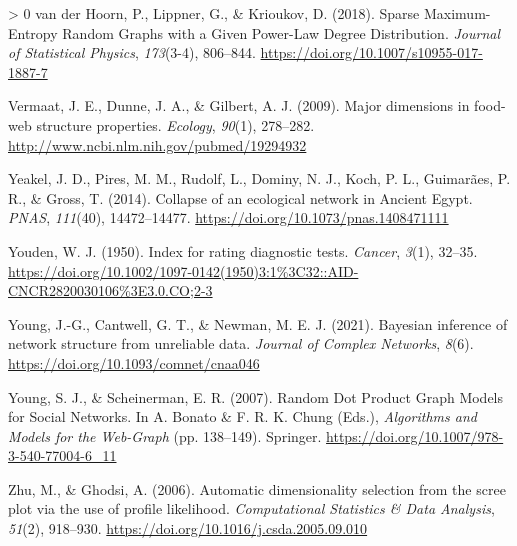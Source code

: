 \documentclass[11pt]{article}
\newlength{\cslhangindent}
\newenvironment{CSLReferences}[3] %
 {%
  \setlength{\parindent}{0pt}
  \ifodd #1 \everypar{\setlength{\hangindent}{\cslhangindent}}\ignorespaces\fi
  \ifnum #2 > 0
  \setlength{\parskip}{#2\baselineskip}
  \fi
 }%
 {}
\begin{document}
\begin{CSLReferences}{1}{0}
\leavevmode\hypertarget{ref-vanderHoorn2018SpaMax}{}%
van der Hoorn, P., Lippner, G., \& Krioukov, D. (2018). Sparse
Maximum-Entropy Random Graphs with a Given Power-Law Degree
Distribution. \emph{Journal of Statistical Physics}, \emph{173}(3-4),
806--844. \url{https://doi.org/10.1007/s10955-017-1887-7}

\leavevmode\hypertarget{ref-Vermaat2009MajDim}{}%
Vermaat, J. E., Dunne, J. A., \& Gilbert, A. J. (2009). Major dimensions
in food-web structure properties. \emph{Ecology}, \emph{90}(1),
278--282. \url{http://www.ncbi.nlm.nih.gov/pubmed/19294932}

\leavevmode\hypertarget{ref-Yeakel2014ColEco}{}%
Yeakel, J. D., Pires, M. M., Rudolf, L., Dominy, N. J., Koch, P. L.,
Guimarães, P. R., \& Gross, T. (2014). Collapse of an ecological network
in Ancient Egypt. \emph{PNAS}, \emph{111}(40), 14472--14477.
\url{https://doi.org/10.1073/pnas.1408471111}

\leavevmode\hypertarget{ref-Youden1950IndRat}{}%
Youden, W. J. (1950). Index for rating diagnostic tests. \emph{Cancer},
\emph{3}(1), 32--35.
\url{https://doi.org/10.1002/1097-0142(1950)3:1\%3C32::AID-CNCR2820030106\%3E3.0.CO;2-3}

\leavevmode\hypertarget{ref-Young2021BayInf}{}%
Young, J.-G., Cantwell, G. T., \& Newman, M. E. J. (2021). Bayesian
inference of network structure from unreliable data. \emph{Journal of
Complex Networks}, \emph{8}(6).
\url{https://doi.org/10.1093/comnet/cnaa046}

\leavevmode\hypertarget{ref-Young2007RanDot}{}%
Young, S. J., \& Scheinerman, E. R. (2007). Random Dot Product Graph
Models for Social Networks. In A. Bonato \& F. R. K. Chung (Eds.),
\emph{Algorithms and Models for the Web-Graph} (pp. 138--149). Springer.
\url{https://doi.org/10.1007/978-3-540-77004-6_11}

\leavevmode\hypertarget{ref-Zhu2006AutDim}{}%
Zhu, M., \& Ghodsi, A. (2006). Automatic dimensionality selection from
the scree plot via the use of profile likelihood. \emph{Computational
Statistics \& Data Analysis}, \emph{51}(2), 918--930.
\url{https://doi.org/10.1016/j.csda.2005.09.010}

\end{CSLReferences}
\end{document}
